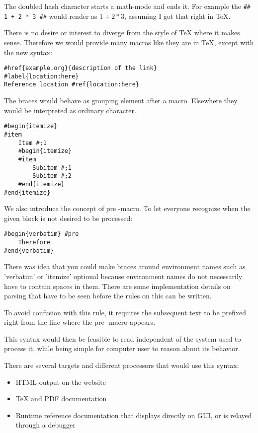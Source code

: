 \documentclass{article}
\begin{document}
The doubled hash character starts a math-mode and ends it.
For example the \verb=## 1 + 2 * 3 ##= would render
as $ 1 + 2 * 3 $, assuming I got that right in TeX.

There is no desire or interest to diverge from the style of
TeX where it makes sense. Therefore we would provide many
macros like they are in TeX, except with the new syntax:

\begin{verbatim}
#href{example.org}{description of the link}
#label{location:here}
Reference location #ref{location:here}
\end{verbatim}

The braces would behave as grouping element after a macro.
Elsewhere they would be interpreted as ordinary character.

\begin{verbatim}
#begin{itemize}
#item
    Item #;1
    #begin{itemize}
    #item
        Subitem #;1
        Subitem #;2
    #end{itemize}
#end{itemize}
\end{verbatim}

We also introduce the concept of pre -macro. To let
everyone recognize when the given block is not desired to be
processed:

\begin{verbatim}
#begin{verbatim} #pre
    Therefore
#end{verbatim}
\end{verbatim}

There was idea that you could make braces around environment
names such as 'verbatim' or 'itemize' optional because
environment names do not necessarily have to contain spaces
in them. There are some implementation details on parsing
that have to be seen before the rules on this can be written.

To avoid confusion with this rule, it requires the
subsequent text to be prefixed right from the line where the
pre -macro appears.

This syntax would then be feasible to read independent of
the system used to process it, while being
simple for computer user to reason about its behavior.


There are several targets and different processors that
would use this syntax:

\begin{itemize}
    \item HTML output on the website
    \item TeX and PDF documentation
    \item Runtime reference documentation that displays
        directly on GUI, or is relayed through a debugger
\end{itemize}
\end{document}
